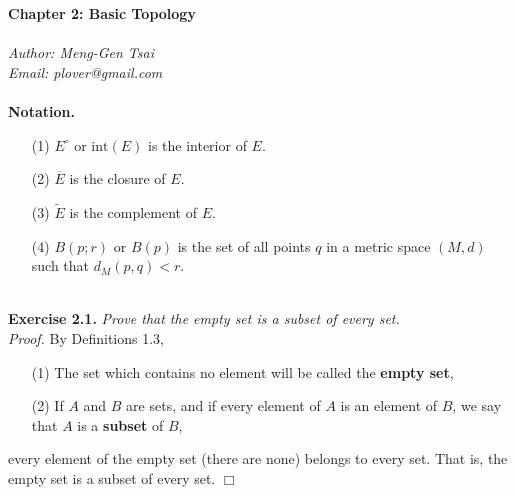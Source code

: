 \documentclass{article}
\begin{document}
\textbf{\Large Chapter 2: Basic Topology} \\\\



\emph{Author: Meng-Gen Tsai} \\
\emph{Email: plover@gmail.com} \\\\









\textbf{Notation.}
\begin{enumerate}
\item[(1)]
$E^{\circ}$ or $\mathrm{int}(E)$ is the interior of $E$.
\item[(2)]
$\overline{E}$ is the closure of $E$.
\item[(3)]
$\widetilde{E}$ is the complement of $E$.
\item[(4)]
$B(p;r)$ or $B(p)$ is the set of all points $q$ in a metric space $(M,d)$
such that $d_M(p,q) < r$. \\\\
\end{enumerate}






\textbf{Exercise 2.1.}
\emph{Prove that the empty set is a subset of every set.} \\

\emph{Proof.}
By Definitions 1.3,
\begin{enumerate}
\item[(1)]
The set which contains no element will be called the \textbf{empty set},
\item[(2)]
If $A$ and $B$ are sets, and if every element of $A$ is an element of $B$,
we say that $A$ is a \textbf{subset} of $B$,
\end{enumerate}
every element of the empty set (there are none) belongs to every set.
That is, the empty set is a subset of every set.
$\Box$ \\\\
\end{document}
